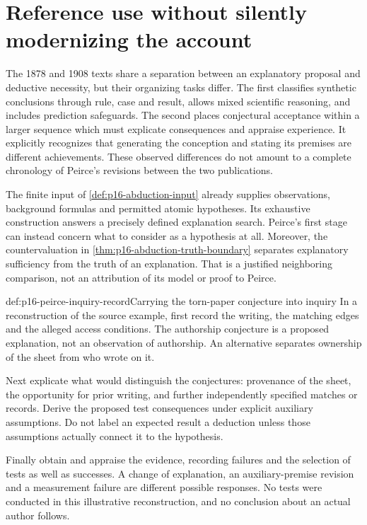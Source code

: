 \section{Reference use without silently modernizing the account}
\label{sec:p16-peirce-reference-use}

The 1878 and 1908 texts share a separation between an explanatory proposal
and deductive necessity, but their organizing tasks differ. The first
classifies synthetic conclusions through rule, case and result, allows
mixed scientific reasoning, and includes prediction safeguards. The
second places conjectural acceptance within a larger sequence which
must explicate consequences and appraise experience. It explicitly
recognizes that generating the conception and stating its premises are
different achievements. These observed differences do not amount to
a complete chronology of Peirce's revisions between the two publications.

The finite input of \cref{def:p16-abduction-input} already supplies
observations, background formulas and permitted atomic hypotheses.
Its exhaustive construction answers a precisely defined explanation
search. Peirce's first stage can instead concern what to consider as
a hypothesis at all. Moreover, the countervaluation in
\cref{thm:p16-abduction-truth-boundary} separates explanatory sufficiency
from the truth of an explanation. That is a justified neighboring
comparison, not an attribution of its model or proof to Peirce.

\begin{hbexample}{def:p16-peirce-inquiry-record}{Carrying the torn-paper conjecture into inquiry}
In a reconstruction of the source example, first record the writing,
the matching edges and the alleged access conditions. The authorship
conjecture is a proposed explanation, not an observation of authorship.
An alternative separates ownership of the sheet from who wrote on it.

Next explicate what would distinguish the conjectures: provenance of
the sheet, the opportunity for prior writing, and further independently
specified matches or records. Derive the proposed test consequences
under explicit auxiliary assumptions. Do not label an expected result
a deduction unless those assumptions actually connect it to the hypothesis.

Finally obtain and appraise the evidence, recording failures and the
selection of tests as well as successes. A change of explanation,
an auxiliary-premise revision and a measurement failure are different
possible responses. No tests were conducted in this illustrative
reconstruction, and no conclusion about an actual author follows.
\end{hbexample}


